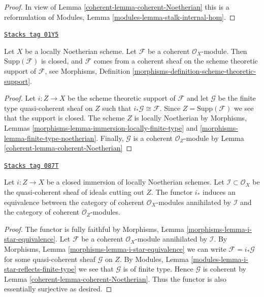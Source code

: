 \begin{proof}

In view of Lemma \ref{coherent-lemma-coherent-Noetherian}
this is a reformulation of
Modules, Lemma \ref{modules-lemma-stalk-internal-hom}.
\end{proof}

\begin{lemma}
\label{coherent-lemma-coherent-support-closed}
\href{https://stacks.math.columbia.edu/tag/01Y5}{\texttt{Stacks tag 01Y5}}

Let $X$ be a locally Noetherian scheme. Let $\mathcal{F}$ be a coherent
$\mathcal{O}_X$-module. Then $\text{Supp}(\mathcal{F})$ is closed, and
$\mathcal{F}$ comes from a coherent sheaf on the scheme theoretic support
of $\mathcal{F}$, see
Morphisms, Definition \ref{morphisms-definition-scheme-theoretic-support}.
\end{lemma}

\begin{proof}

Let $i : Z \to X$ be the scheme theoretic support of $\mathcal{F}$ and
let $\mathcal{G}$ be the finite type quasi-coherent sheaf on $Z$
such that $i_*\mathcal{G} \cong \mathcal{F}$.
Since $Z = \text{Supp}(\mathcal{F})$ we see that the support is closed.
The scheme $Z$ is locally Noetherian by
Morphisms, Lemmas \ref{morphisms-lemma-immersion-locally-finite-type}
and \ref{morphisms-lemma-finite-type-noetherian}.
Finally, $\mathcal{G}$ is a coherent $\mathcal{O}_Z$-module by
Lemma \ref{coherent-lemma-coherent-Noetherian}
\end{proof}

\begin{lemma}
\label{coherent-lemma-i-star-equivalence}
\href{https://stacks.math.columbia.edu/tag/087T}{\texttt{Stacks tag 087T}}

Let $i : Z \to X$ be a closed immersion of locally Noetherian schemes.
Let $\mathcal{I} \subset \mathcal{O}_X$ be the quasi-coherent sheaf of ideals
cutting out $Z$. The functor $i_*$ induces an equivalence between the
category of coherent $\mathcal{O}_X$-modules annihilated by $\mathcal{I}$
and the category of coherent $\mathcal{O}_Z$-modules.
\end{lemma}

\begin{proof}

The functor is fully faithful by
Morphisms, Lemma \ref{morphisms-lemma-i-star-equivalence}.
Let $\mathcal{F}$ be a coherent $\mathcal{O}_X$-module
annihilated by $\mathcal{I}$. By
Morphisms, Lemma \ref{morphisms-lemma-i-star-equivalence}
we can write $\mathcal{F} = i_*\mathcal{G}$ for some quasi-coherent
sheaf $\mathcal{G}$ on $Z$. By
Modules, Lemma \ref{modules-lemma-i-star-reflects-finite-type}
we see that $\mathcal{G}$ is of finite type.
Hence $\mathcal{G}$ is coherent by
Lemma \ref{coherent-lemma-coherent-Noetherian}.
Thus the functor is also essentially surjective as desired.
\end{proof}

